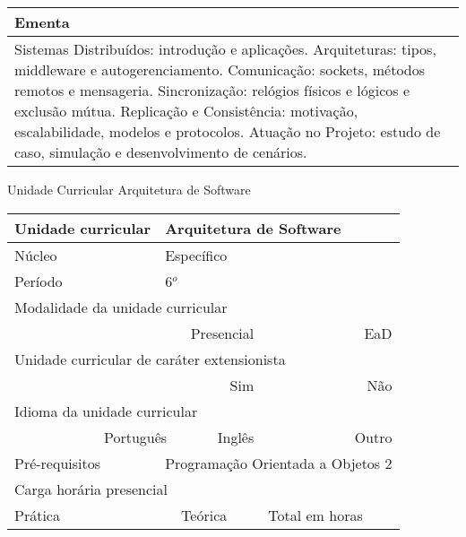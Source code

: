 \begin{quadro}[ht!]
\begin{tabular}{|p{3cm} p{2cm} p{3cm} p{2cm} p{3cm} p{2cm}|}
\multicolumn{6}{|p{15cm}|}{\cellcolor{blue1} Ementa} \\\hline
\hline\multicolumn{6}{|p{15cm}|}{\scriptsize Sistemas Distribuídos: introdução e aplicações. Arquiteturas: tipos, middleware e autogerenciamento. Comunicação: sockets, métodos remotos e mensageria. Sincronização: relógios físicos e lógicos e exclusão mútua. Replicação e Consistência: motivação, escalabilidade, modelos e protocolos. Atuação no Projeto: estudo de caso, simulação e desenvolvimento de cenários.}\\\hline
\hline
	\end{tabular}
\end{quadro}
\clearpage
\newpage\begin{quadro}[ht!]
  \centering\scriptsize
\caption{Unidade Curricular Arquitetura de Software}
\label{ unit_28 }
\begin{tabular}{|p{3cm} p{2cm} p{3cm} p{2cm} p{3cm} p{2cm}|}\hline
\multicolumn{1}{|p{3cm}|}{\cellcolor{blue1} Unidade curricular} & \multicolumn{5}{p{9cm}|}{ Arquitetura de Software }\\\hline
\multicolumn{1}{|p{3cm}|}{\cellcolor{blue1} Núcleo} & \multicolumn{5}{p{11.5cm}|}{ Específico }\\\hline
\multicolumn{1}{|p{3cm}|}{\cellcolor{blue1} Período} & \multicolumn{5}{p{9cm}|}{ 6$^o$ }\\\hline
\multicolumn{6}{|p{15cm}|}{\cellcolor{blue1} Modalidade da unidade curricular} \\\hline
\multicolumn{2}{|r}{		} &  \multicolumn{2}{r}{Presencial \XBox } & \multicolumn{2}{r|}{EaD \Square	} \\\hline
\multicolumn{6}{|p{15cm}|}{\cellcolor{blue1} Unidade curricular de caráter extensionista} \\\hline
\multicolumn{4}{|r}{			Sim \Square	} & \multicolumn{2}{r|}{	Não \XBox	}\\\hline
\multicolumn{6}{|p{15cm}|}{\cellcolor{blue1} Idioma da unidade curricular} \\ \hline
\multicolumn{2}{|r}{	Português \XBox	} &  \multicolumn{2}{r}{	Inglês \Square	} & \multicolumn{2}{r|}{	Outro \Square	} \\ \hline
\multicolumn{1}{|p{3cm}|}{\cellcolor{blue1} Pré-requisitos} & \multicolumn{5}{p{9cm}|}{ Programação Orientada a Objetos 2 }\\ \hline
\multicolumn{6}{|p{15cm}|}{\cellcolor{blue1} Carga horária presencial} \\ \hline
\multicolumn{1}{|p{3cm}|}{\raggedleft Prática} & \multicolumn{1}{p{1cm}|}{\centering	30	} &  \multicolumn{1}{p{3cm}|}{\raggedleft Teórica}  & \multicolumn{1}{p{1cm}|}{\centering 	30 } & \multicolumn{1}{p{3cm}|}{\raggedleft Total em horas} & \multicolumn{1}{p{1cm}|}{\raggedleft	60	} \\ \hline

\end{tabular}
\end{quadro}
